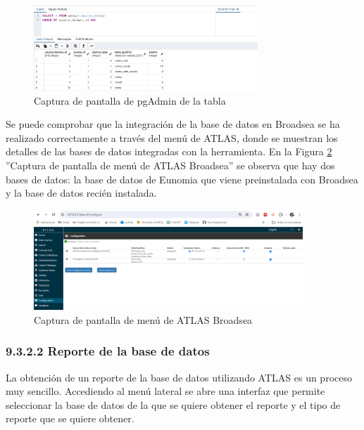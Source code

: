 \begin{figure}[H]
    \centering
    \includegraphics[width=0.75\textwidth]{figures/source_daimonHUVR.png}
    \caption{Captura de pantalla de pgAdmin de la tabla }
    \label{figure:source_daimonHUVR}
\end{figure}

Se puede comprobar que la integración de la base de datos en Broadsea se ha realizado correctamente a través del menú  de ATLAS, donde se muestran los detalles de las bases de datos integradas con la herramienta. En la Figura \ref{figure:configATLAS} ''Captura de pantalla de menú  de ATLAS Broadsea'' se observa que hay dos bases de datos: la base de datos de Eunomia que viene preinstalada con Broadsea y la base de datos recién instalada.

\begin{figure}[H]
    \centering
    \includegraphics[width=0.90\textwidth]{figures/configATLAS.png}
    \caption{Captura de pantalla de menú  de ATLAS Broadsea}
    \label{figure:configATLAS}
\end{figure}

\subsubsection{9.3.2.2 Reporte de la base de datos}

La obtención de un reporte de la base de datos utilizando ATLAS es un proceso muy sencillo. Accediendo al menú lateral  se abre una interfaz que permite seleccionar la base de datos de la que se quiere obtener el reporte y el tipo de reporte que se quiere obtener.

